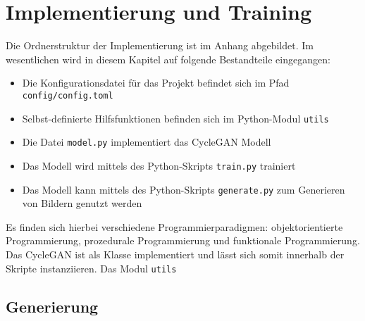 \chapter{Implementierung und Training}

Die Ordnerstruktur der Implementierung ist im Anhang abgebildet. Im wesentlichen wird in diesem Kapitel auf folgende Bestandteile eingegangen:
\begin{itemize}
   \item Die Konfigurationsdatei für das Projekt befindet sich im Pfad \texttt{config/config.toml}
   \item Selbst-definierte Hilfsfunktionen befinden sich im Python-Modul \texttt{utils}
   \item Die Datei \texttt{model.py} implementiert das \ac{CycleGAN} Modell
   \item Das Modell wird mittels des Python-Skripts \texttt{train.py} trainiert
   \item Das Modell kann mittels des Python-Skripts \texttt{generate.py} zum Generieren von Bildern genutzt werden
\end{itemize}

Es finden sich hierbei verschiedene Programmierparadigmen: objektorientierte Programmierung, prozedurale Programmierung und funktionale Programmierung. Das \ac{CycleGAN} ist als Klasse implementiert und lässt sich somit innerhalb der Skripte instanziieren. Das Modul \texttt{utils} 








\section{Generierung}